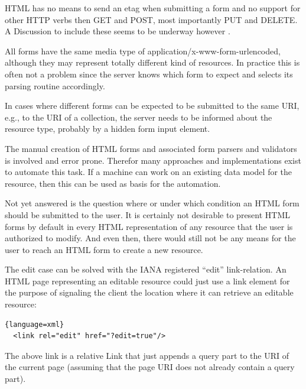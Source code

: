 \documentclass[11pt,a4paper,headsepline,twoside]{scrartcl}		%
\begin{document}
HTML has no means to send an etag when submitting a form and no support for
other HTTP verbs then GET and POST, most importantly PUT and DELETE. A
Discussion to include these seems to be underway however \cite{Amundsen2011}.

All forms have the same media type of application/x-www-form-urlencoded,
although they may represent totally different kind of resources. In practice
this is often not a problem since the server knows which form to expect and
selects its parsing routine accordingly.

In cases where different forms can be expected to be submitted to the same URI,
e.g., to the URI of a collection, the server needs to be informed about the
resource type, probably by a hidden form input element.

The manual creation of HTML forms and associated form parsers and validators is
involved and error prone. Therefor many approaches and implementations exist to
automate this task. If a machine can work on an existing data model for the
resource, then this can be used as basis for the automation.


Not yet answered is the question where or under which condition an HTML form
should be submitted to the user. It is certainly not desirable to present HTML
forms by default in every HTML representation of any resource that the user is
authorized to modify. And even then, there would still not be any means for the
user to reach an HTML form to create a new resource.

The edit case can be solved with the IANA registered ``edit'' link-relation. An
HTML page representing an editable resource could just use a link element for
the purpose of signaling the client the location where it can retrieve an
editable resource:

\begin{lstlisting}{language=xml}
  <link rel="edit" href="?edit=true"/>
\end{lstlisting}

The above link is a relative Link that just appends a query part to the URI of
the current page (assuming that the page URI does not already contain a query
part).
\end{document}
